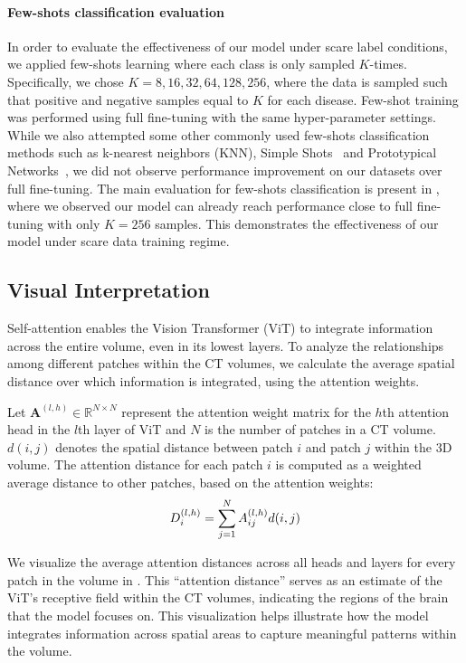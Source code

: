 \documentclass[fleqn,10pt]{wlscirep}
\begin{document}
\paragraph{Few-shots classification evaluation}
In order to evaluate the effectiveness of our model under scare label conditions, we applied few-shots learning where each class is only sampled $K$-times. Specifically, we chose $K=8, 16, 32, 64, 128, 256$, where the data is sampled such that positive and negative samples equal to $K$ for each disease. Few-shot training was performed using full fine-tuning with the same hyper-parameter settings. While we also attempted some other commonly used few-shots classification methods such as k-nearest neighbors (KNN), Simple Shots~\cite{want19simpleshot} and Prototypical Networks~\cite{jake17proto}, we did not observe performance improvement on our datasets over full fine-tuning. The main evaluation for few-shots classification is present in , where we observed our model can already reach performance close to full fine-tuning with only $K=256$ samples. This demonstrates the effectiveness of our model under scare data training regime.

\subsection*{Visual Interpretation}
\label{sec:visual_interpretation}
Self-attention enables the Vision Transformer (ViT) to integrate information across the entire volume, even in its lowest layers. To analyze the relationships among different patches within the CT volumes, we calculate the average spatial distance over which information is integrated, using the attention weights. 

Let $\mathbf{A}^{(l,h)} \in \mathbb{R}^{N \times N}$  represent the attention weight matrix for the $h$th attention head in the $l$th layer of ViT and $N$ is the number of patches in a CT volume. $d(i, j)$ denotes the spatial distance between patch $i$ and patch $j$ within the 3D volume. The attention distance for each patch $i$ is computed as a weighted average distance to other patches, based on the attention weights:
\begin{equation}
    \centering
    D_i^{(l, h)} = \sum_{j=1}^{N} A^{(l, h)}_{ij}  d(i, j)
\end{equation}

We visualize the average attention distances across all heads and layers for every patch in the volume in . This “attention distance” serves as an estimate of the ViT’s receptive field within the CT volumes, indicating the regions of the brain that the model focuses on. This visualization helps illustrate how the model integrates information across spatial areas to capture meaningful patterns within the volume.
\end{document}
